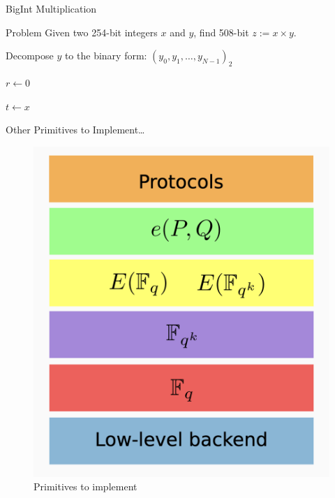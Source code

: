 \documentclass{zkdl-presentation-template}
\begin{document}
    \begin{frame}[fragile]{BigInt Multiplication}
        \begin{block}{Problem}
            Given two 254-bit integers $x$ and $y$, find 508-bit $z := x \times y$.\pause
        \end{block}

        \small
        \begin{algorithm}[H]
          \caption{Double-and-add method for integer multiplication}\label{alg:double_and_add}
          
          Decompose $y$ to the binary form: $(y_0,y_1,\dots,y_{N-1})_2$\pause
          
          $r \gets 0$
          
          $t \gets x$\pause
          
          \pause
          
          
        \end{algorithm}
    \end{frame}

    \begin{frame}[fragile]{Other Primitives to Implement\ldots}
        \begin{figure}
            \centering
            \includegraphics[width=0.575\linewidth]{images/levels.png}
            \caption{Primitives to implement}
            \label{fig:primitives}
        \end{figure}
    \end{frame}
\end{document}
